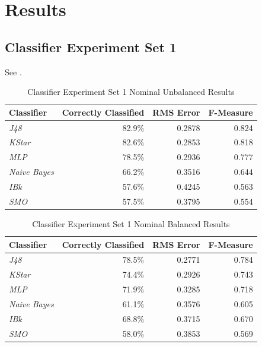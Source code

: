 \documentclass[../thesis/thesis.tex]{subfiles}
\begin{document}
 \chapter{Results}

 \section{Classifier Experiment Set 1}
 See .

\begin{table}
\centering
\begin{tabular}{|l|r|r|r|}
\hline
\textbf{Classifier}  & \textbf{Correctly Classified} & \textbf{RMS Error} & \textbf{F-Measure} \\ \hline
\textit{J48}         & 82.9\%                        & 0.2878             & 0.824              \\ \hline
\textit{KStar}       & 82.6\%                        & 0.2853             & 0.818              \\ \hline
\textit{MLP}         & 78.5\%                        & 0.2936             & 0.777              \\ \hline
\textit{Naive Bayes} & 66.2\%                        & 0.3516             & 0.644              \\ \hline
\textit{IBk}         & 57.6\%                        & 0.4245             & 0.563              \\ \hline
\textit{SMO}         & 57.5\%                        & 0.3795             & 0.554              \\ \hline
\end{tabular}
\caption{Classifier Experiment Set 1 Nominal Unbalanced Results}
\end{table}

\begin{table}
\centering
\begin{tabular}{|l|r|r|r|}
\hline
\textbf{Classifier}  & \textbf{Correctly Classified} & \textbf{RMS Error} & \textbf{F-Measure} \\ \hline
\textit{J48}         & 78.5\%                        & 0.2771             & 0.784              \\ \hline
\textit{KStar}       & 74.4\%                        & 0.2926             & 0.743              \\ \hline
\textit{MLP}         & 71.9\%                        & 0.3285             & 0.718              \\ \hline
\textit{Naive Bayes} & 61.1\%                        & 0.3576             & 0.605              \\ \hline
\textit{IBk}         & 68.8\%                        & 0.3715             & 0.670              \\ \hline
\textit{SMO}         & 58.0\%                        & 0.3853             & 0.569              \\ \hline
\end{tabular}
\caption{Classifier Experiment Set 1 Nominal Balanced Results}
\end{table}
\end{document}
